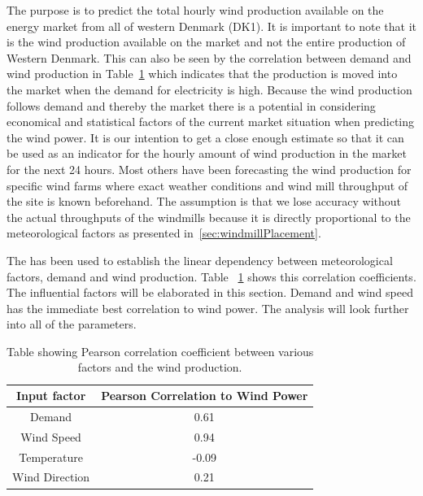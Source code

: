 The purpose is to predict the total hourly wind production available on the energy market from all of western Denmark (DK1). It is important to note that it is the wind production available on the market and not the entire production of Western Denmark. This can also be seen by the correlation between demand and wind production in Table~\ref{table:pearsonCoeficientWindProduction} which indicates that the production is moved into the market when the demand for electricity is high. Because the wind production follows demand and thereby the market there is a potential in considering  economical and statistical factors of the current market situation when predicting the wind power. It is our intention to get a close enough estimate so that it can be used as an indicator for the hourly amount of wind production in the market for the next 24 hours.
Most others have been forecasting the wind production for specific wind farms where exact weather conditions and wind mill throughput of the site is known beforehand. The assumption is that we lose accuracy without the actual throughputs of the windmills because it is directly proportional to the meteorological factors as presented in~\ref{sec:windmillPlacement}. 

The  has been used to establish the linear dependency between meteorological factors, demand and wind production. Table ~\ref{table:pearsonCoeficientWindProduction} shows this correlation coefficients. The influential factors will be elaborated in this section. Demand and wind speed has the immediate best correlation to wind power. The analysis will look further into all of the parameters.

\begin{table}[H]
\centering  %
\begin{tabular}{|c|c|} %
\hline
Input factor & Pearson Correlation to Wind Power \\ 
\hline                  %
Demand & 0.61 \\ \hline %
Wind Speed & 0.94 \\ \hline
Temperature & -0.09 \\ \hline
Wind Direction & 0.21 \\
\hline %
\end{tabular}
\caption{Table showing Pearson correlation coefficient between various factors and the wind production.} %
\label{table:pearsonCoeficientWindProduction} %
\end{table}

